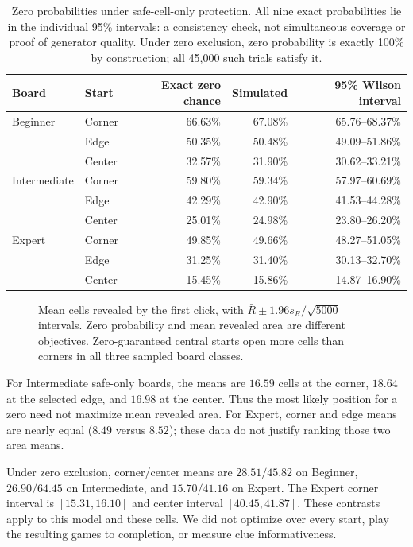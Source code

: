 \documentclass[11pt,letterpaper]{article}
\begin{document}
\begin{table}[tb]\centering\small
\begin{tabular}{llrrr}
\toprule
Board & Start & Exact zero chance & Simulated & 95\% Wilson interval\\
\midrule
Beginner & Corner &66.63\%&67.08\%&65.76--68.37\%\\
 & Edge &50.35\%&50.48\%&49.09--51.86\%\\
 & Center &32.57\%&31.90\%&30.62--33.21\%\\
\addlinespace
Intermediate & Corner &59.80\%&59.34\%&57.97--60.69\%\\
 & Edge &42.29\%&42.90\%&41.53--44.28\%\\
 & Center &25.01\%&24.98\%&23.80--26.20\%\\
\addlinespace
Expert & Corner &49.85\%&49.66\%&48.27--51.05\%\\
 & Edge &31.25\%&31.40\%&30.13--32.70\%\\
 & Center &15.45\%&15.86\%&14.87--16.90\%\\
\bottomrule
\end{tabular}
\caption{Zero probabilities under safe-cell-only protection. All nine exact probabilities lie in the individual 95\% intervals: a consistency check, not simultaneous coverage or proof of generator quality. Under zero exclusion, zero probability is exactly 100\% by construction; all 45,000 such trials satisfy it.}
\label{tab:zero}
\end{table}

\begin{figure}[tb]\centering

\caption{Mean cells revealed by the first click, with $\bar R\pm1.96s_R/\sqrt{5000}$ intervals. Zero probability and mean revealed area are different objectives. Zero-guaranteed central starts open more cells than corners in all three sampled board classes.}
\label{fig:area}
\end{figure}

For Intermediate safe-only boards, the means are $16.59$ cells at the corner, $18.64$ at the selected edge, and $16.98$ at the center. Thus the most likely position for a zero need not maximize mean revealed area. For Expert, corner and edge means are nearly equal ($8.49$ versus $8.52$); these data do not justify ranking those two area means.

Under zero exclusion, corner/center means are $28.51/45.82$ on Beginner, $26.90/64.45$ on Intermediate, and $15.70/41.16$ on Expert. The Expert corner interval is $[15.31,16.10]$ and center interval $[40.45,41.87]$. These contrasts apply to this model and these cells. We did not optimize over every start, play the resulting games to completion, or measure clue informativeness.
\end{document}
